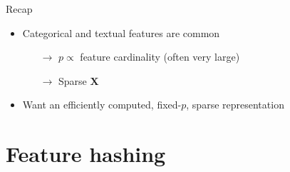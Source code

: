 \documentclass[12pt,aspectratio=169]{beamer}
\renewcommand{\vec}[1]{\ensuremath{\mathbf{#1}}}
\newcommand{\mat}[1]{\ensuremath{\vec{#1}}}
\begin{document}
\begin{frame}{Recap}
    \begin{itemize}
        \setlength\itemsep{\bigskipamount}
        \item Categorical and textual features are common
              \begin{itemize}
                  \item[$\to$] $p \propto$ feature cardinality
                               (often very large)
                  \item[$\to$] Sparse $\mat{X}$
              \end{itemize}
        \item Want an efficiently computed, fixed\hyp{}$p$, sparse
              representation
    \end{itemize}
\end{frame}

\section{Feature hashing}
\end{document}
